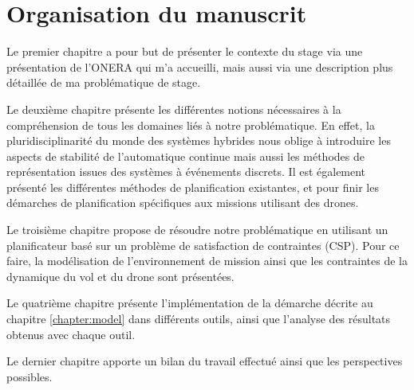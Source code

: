 \chapter*{Organisation du manuscrit}

Le premier chapitre a pour but de présenter le contexte du stage via une présentation de l'ONERA qui m'a accueilli, mais aussi via une description plus détaillée de ma problématique de stage.

Le deuxième chapitre présente les différentes notions nécessaires à la compréhension de tous les domaines liés à notre problématique. En effet, la pluridisciplinarité du monde des systèmes hybrides nous oblige à introduire les aspects de stabilité de l'automatique continue mais aussi les méthodes de représentation issues des systèmes à événements discrets. Il est également présenté les différentes méthodes de planification existantes, et pour finir les démarches de planification spécifiques aux missions utilisant des drones.

Le troisième chapitre propose de résoudre notre problématique en utilisant un planificateur basé sur un problème de satisfaction de contraintes (CSP). Pour ce faire, la modélisation de l'environnement de mission ainsi que les contraintes de la dynamique du vol et du drone sont présentées.

Le quatrième chapitre présente l'implémentation de la démarche décrite au chapitre \ref{chapter:model} dans différents outils, ainsi que l'analyse des résultats obtenus avec chaque outil.

Le dernier chapitre apporte un bilan du travail effectué ainsi que les perspectives possibles.




 
